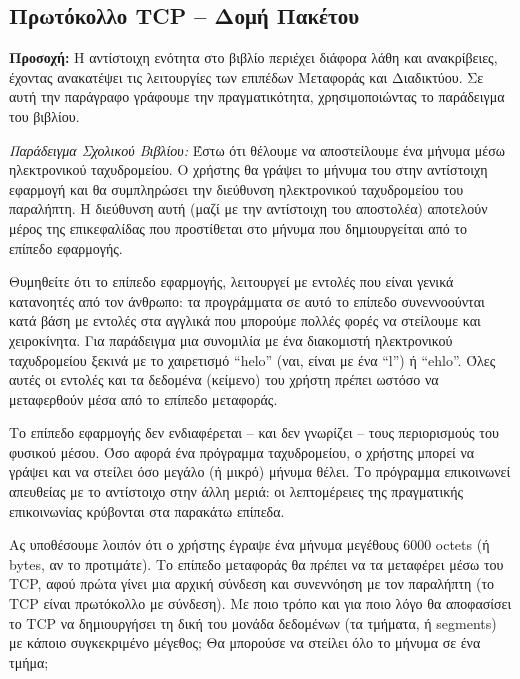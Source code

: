 %
%
\subsection{Πρωτόκολλο TCP -- Δομή Πακέτου}

\begin{inthebox}
\textbf{Προσοχή:} Η αντίστοιχη ενότητα στο βιβλίο περιέχει διάφορα λάθη και ανακρίβειες, έχοντας ανακατέψει τις λειτουργίες των επιπέδων Μεταφοράς και Διαδικτύου. Σε αυτή την παράγραφο γράφουμε την πραγματικότητα, χρησιμοποιώντας το παράδειγμα του βιβλίου.\\
\end{inthebox}


\emph{Παράδειγμα Σχολικού Βιβλίου:} Έστω ότι θέλουμε να αποστείλουμε ένα μήνυμα μέσω ηλεκτρονικού ταχυδρομείου. Ο χρήστης θα γράψει το μήνυμα του στην αντίστοιχη εφαρμογή και θα συμπληρώσει την διεύθυνση ηλεκτρονικού ταχυδρομείου του παραλήπτη. Η διεύθυνση αυτή (μαζί με την αντίστοιχη του αποστολέα) αποτελούν μέρος της επικεφαλίδας που προστίθεται στο μήνυμα που δημιουργείται από το επίπεδο εφαρμογής.

Θυμηθείτε ότι το επίπεδο εφαρμογής, λειτουργεί με εντολές που είναι γενικά κατανοητές από τον άνθρωπο: τα προγράμματα σε αυτό το επίπεδο συνεννοούνται κατά βάση με εντολές στα αγγλικά που μπορούμε πολλές φορές να στείλουμε και χειροκίνητα. Για παράδειγμα μια συνομιλία με ένα διακομιστή ηλεκτρονικού ταχυδρομείου ξεκινά με το χαιρετισμό ``helo'' (ναι, είναι με ένα ``l'') ή ``ehlo''. Όλες αυτές οι εντολές και τα δεδομένα (κείμενο) του χρήστη πρέπει ωστόσο να μεταφερθούν μέσα από το επίπεδο μεταφοράς.

Το επίπεδο εφαρμογής δεν ενδιαφέρεται -- και δεν γνωρίζει -- τους περιορισμούς του φυσικού μέσου. Όσο αφορά ένα πρόγραμμα ταχυδρομείου, ο χρήστης μπορεί να γράψει και να στείλει όσο μεγάλο (ή μικρό) μήνυμα θέλει. Το πρόγραμμα επικοινωνεί απευθείας με το αντίστοιχο στην άλλη μεριά: οι λεπτομέρειες της πραγματικής επικοινωνίας κρύβονται στα παρακάτω επίπεδα.

Ας υποθέσουμε λοιπόν ότι ο χρήστης έγραψε ένα μήνυμα μεγέθους 6000 octets (ή bytes, αν το προτιμάτε). Το επίπεδο μεταφοράς θα πρέπει να τα μεταφέρει μέσω του TCP, αφού πρώτα γίνει μια αρχική σύνδεση και συνεννόηση με τον παραλήπτη (το TCP είναι πρωτόκολλο με σύνδεση). Με ποιο τρόπο και για ποιο λόγο θα αποφασίσει το TCP να δημιουργήσει τη δική του μονάδα δεδομένων (τα τμήματα, ή segments) με κάποιο συγκεκριμένο μέγεθος; Θα μπορούσε να στείλει όλο το μήνυμα σε ένα τμήμα;


